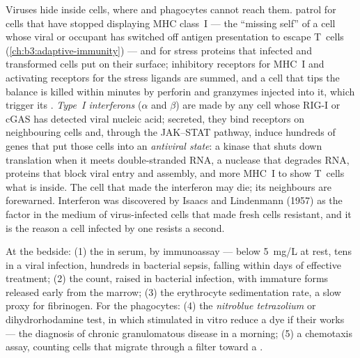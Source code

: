 \begin{definition}\label{def:b3:innate-immunity:nk-ifn}
Viruses hide inside cells, where  and phagocytes cannot
reach them. \emph{} patrol for cells that have
stopped displaying MHC class~I --- the ``missing self'' of a cell whose
viral or  occupant has switched off antigen presentation to
escape T~cells (\cref{ch:b3:adaptive-immunity}) --- and for stress
proteins that infected and transformed cells put on their surface;
inhibitory receptors for MHC~I and activating receptors for the stress
ligands are summed, and a cell that tips the balance is killed within
minutes by perforin and granzymes injected into it, which trigger its
. \emph{Type~I interferons} ($\alpha$ and $\beta$) are made by
any cell whose RIG-I or cGAS has detected viral nucleic acid; secreted,
they bind receptors on neighbouring cells and, through the JAK--STAT
pathway, induce hundreds of genes that put those cells into an
\emph{antiviral state}: a kinase that shuts down translation when it
meets double-stranded RNA, a nuclease that degrades RNA, proteins that
block viral entry and assembly, and more MHC~I to show T~cells what is
inside. The cell that made the interferon may die; its neighbours are
forewarned. Interferon was discovered by Isaacs and Lindenmann (1957)
as the factor in the medium of virus-infected cells that made fresh
cells resistant, and it is the reason a cell infected by one 
resists a second.
\end{definition}

\begin{method}\label{met:b3:innate-immunity:tests}
At the bedside: (1) the \emph{} in serum, by
immunoassay --- below \qty{5}{mg/L} at rest, tens in a viral infection,
hundreds in bacterial sepsis, falling within days of effective
treatment; (2) the  count, raised in bacterial infection,
with immature forms released early from the marrow; (3) the
erythrocyte sedimentation rate, a slow proxy for fibrinogen. For the
phagocytes: (4) the \emph{nitroblue tetrazolium} or dihydrorhodamine
test, in which  stimulated in vitro reduce a dye if their
 works --- the diagnosis of chronic granulomatous disease
in a morning; (5) a chemotaxis assay, counting cells that migrate
through a filter toward a .
\end{method}

